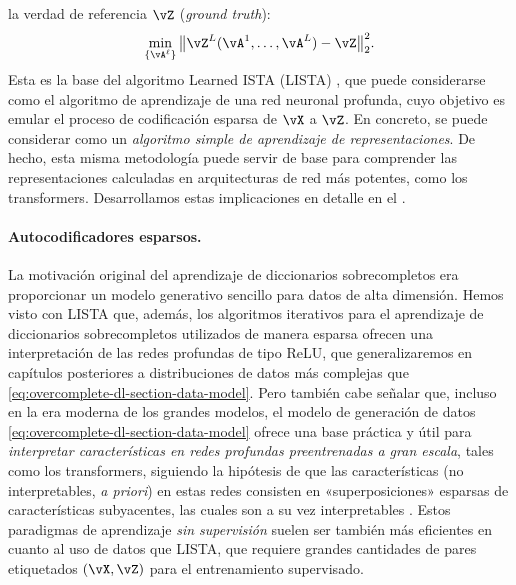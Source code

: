 \documentclass[../../book-main.tex]{subfiles}
\begin{document}
la verdad de referencia $\vZ$ (\textit{ground truth}):
\begin{equation}\label{eq:lista-training}
    \min_{\{\vA^\ell\}} \big\|\vZ^L(\vA^1, \ldots, \vA^{L}) - \vZ\big\|_2^2.
\end{equation}
Esta es la base del algoritmo Learned ISTA (LISTA)
\cite{gregor2010learning}, que puede considerarse como el algoritmo de aprendizaje
de una red neuronal profunda, cuyo objetivo es emular el
proceso de codificación esparsa de $\vX$ a $\vZ$. En concreto,
se puede considerar como un \textit{algoritmo simple de aprendizaje de representaciones}.
De hecho, esta misma metodología puede servir de base para comprender las
representaciones calculadas en arquitecturas de red más potentes, como
los transformers. Desarrollamos estas implicaciones en detalle en
el .

\paragraph{Autocodificadores esparsos.}
La motivación original del aprendizaje de diccionarios sobrecompletos era proporcionar
un modelo generativo sencillo para datos de alta dimensión. Hemos visto
con LISTA que, además, los algoritmos iterativos para el aprendizaje de diccionarios sobrecompletos
utilizados de manera esparsa ofrecen una interpretación de las redes profundas de tipo ReLU, que
generalizaremos en capítulos posteriores a distribuciones de datos más complejas que
\eqref{eq:overcomplete-dl-section-data-model}.
Pero también cabe señalar que, incluso en la era moderna de los grandes
modelos, el modelo de generación de datos
\eqref{eq:overcomplete-dl-section-data-model}
ofrece una base práctica y útil
para
\textit{interpretar características en redes profundas preentrenadas a gran escala}, 
tales como los transformers, siguiendo la hipótesis de que las
características (no interpretables, \textit{a priori}) en estas redes consisten 
en «superposiciones» esparsas de características subyacentes, las cuales son 
a su vez interpretables \cite{elhage2022superposition}. Estos paradigmas de 
aprendizaje \textit{sin supervisión} suelen ser también más eficientes en 
cuanto al uso de datos que LISTA, que requiere grandes cantidades
de pares etiquetados $(\vX, \vZ)$ para el entrenamiento supervisado.
\end{document}
